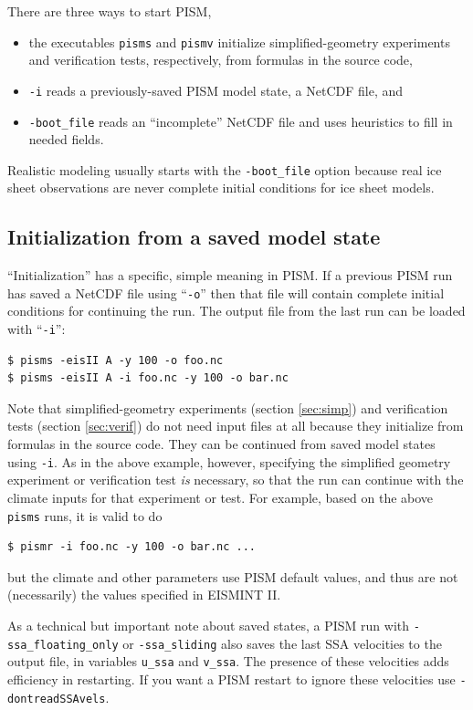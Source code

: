 \documentclass[titlepage,letterpaper,final]{scrartcl}
\begin{document}
There are three ways to start PISM,\begin{itemize}
\item the executables \texttt{pisms} and \texttt{pismv} initialize simplified-geometry experiments and verification tests, respectively, from formulas in the source code,
\item \texttt{-i} reads a previously-saved PISM model state, a NetCDF file, and
\item \texttt{-boot_file} reads an ``incomplete'' NetCDF file and uses heuristics to fill in needed fields.
\end{itemize}
Realistic modeling usually starts with the \texttt{-boot_file} option because real ice sheet observations are never complete initial conditions for ice sheet models.

\subsection{Initialization from a saved model state}  ``Initialization'' has a specific, simple meaning in PISM.  If a previous PISM run has saved a NetCDF file using ``\texttt{-o}'' then that file will contain complete initial conditions for continuing the run.  The output file from the last run can be loaded with ``\texttt{-i}'': 

\begin{verbatim}
$ pisms -eisII A -y 100 -o foo.nc
$ pisms -eisII A -i foo.nc -y 100 -o bar.nc
\end{verbatim}
\smallskip

Note that simplified-geometry experiments (section \ref{sec:simp}) and verification tests (section \ref{sec:verif}) do not need input files at all because they initialize from formulas in the source code.  They can be continued from saved model states using \texttt{-i}.  As in the above example, however, specifying the simplified geometry experiment or verification test \emph{is} necessary, so that the run can continue with the climate inputs for that experiment or test.  For example, based on the above \texttt{pisms} runs, it is valid to do
\begin{verbatim}
$ pismr -i foo.nc -y 100 -o bar.nc ...
\end{verbatim}
but the climate and other parameters use PISM default values, and thus are not (necessarily) the values specified in EISMINT II.

As a technical but important note about saved states, a PISM run with \texttt{-ssa_floating_only} or \texttt{-ssa_sliding}
also saves the last SSA velocities to the output file, in variables 
\texttt{u_ssa} and \texttt{v_ssa}. The presence
of these velocities adds efficiency in restarting.  If you want a PISM restart to
ignore these velocities use \texttt{-dontreadSSAvels}.
\end{document}
